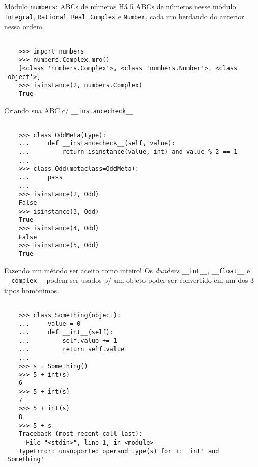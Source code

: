 \documentclass[utf8]{beamer}
\begin{document}
\begin{frame}[fragile]{Módulo \texttt{numbers}: ABCs de números}
  Há 5 ABCs de números nesse módulo:
  \texttt{Integral},
  \texttt{Rational},
  \texttt{Real},
  \texttt{Complex} e
  \texttt{Number},
  cada um herdando do anterior nessa ordem.

  \begin{verbatim}

    >>> import numbers
    >>> numbers.Complex.mro()
    [<class 'numbers.Complex'>, <class 'numbers.Number'>, <class 'object'>]
    >>> isinstance(2, numbers.Complex)
    True

  \end{verbatim}

\end{frame}


\begin{frame}[fragile]{Criando sua ABC c/
                       \texttt{\_\_instancecheck\_\_}}
  \begin{verbatim}

    >>> class OddMeta(type):
    ...     def __instancecheck__(self, value):
    ...         return isinstance(value, int) and value % 2 == 1
    ...
    >>> class Odd(metaclass=OddMeta):
    ...     pass
    ...
    >>> isinstance(2, Odd)
    False
    >>> isinstance(3, Odd)
    True
    >>> isinstance(4, Odd)
    False
    >>> isinstance(5, Odd)
    True

  \end{verbatim}
\end{frame}


\begin{frame}[fragile]{Fazendo um método ser aceito como inteiro!}
  Os \emph{dunders}
  \texttt{__int__},
  \texttt{__float__} e
  \texttt{__complex__}
  podem ser usados p/ um objeto
  poder ser convertido em um dos $3$ tipos homônimos.

  \begin{verbatim}

    >>> class Something(object):
    ...     value = 0
    ...     def __int__(self):
    ...         self.value += 1
    ...         return self.value
    ...
    >>> s = Something()
    >>> 5 + int(s)
    6
    >>> 5 + int(s)
    7
    >>> 5 + int(s)
    8
    >>> 5 + s
    Traceback (most recent call last):
      File "<stdin>", line 1, in <module>
    TypeError: unsupported operand type(s) for +: 'int' and 'Something'

  \end{verbatim}
\end{frame}
\end{document}
